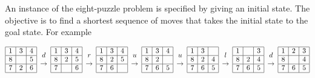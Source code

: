 \documentclass[12pt]{article}
\begin{document}
\noindent
An instance of the eight-puzzle problem is specified by giving an
initial state. 
The objective is to find a shortest sequence of
moves that takes the initial state to the goal state.
For example

\[
\begin{array}{|c|c|c|}\hline
1 & 3 & 4 \\\hline
8 &   & 5 \\\hline
7 & 2 & 6 \\\hline
\end{array}
\begin{array}{c}d\\\rightarrow\end{array}
\begin{array}{|c|c|c|}\hline
1 & 3 & 4 \\\hline
8 & 2 & 5 \\\hline
7 &   & 6 \\\hline
\end{array}
\begin{array}{c}r\\\rightarrow\end{array}
\begin{array}{|c|c|c|}\hline
1 & 3 & 4 \\\hline
8 & 2 & 5 \\\hline
7 & 6 &   \\\hline
\end{array}
\begin{array}{c}u\\\rightarrow\end{array}
\begin{array}{|c|c|c|}\hline
1 & 3 & 4 \\\hline
8 & 2 &   \\\hline
7 & 6 & 5 \\\hline
\end{array}
\begin{array}{c}u\\\rightarrow\end{array}
\begin{array}{|c|c|c|}\hline
1 & 3 &   \\\hline
8 & 2 & 4 \\\hline
7 & 6 & 5 \\\hline
\end{array}
\begin{array}{c}l\\\rightarrow\end{array}
\begin{array}{|c|c|c|}\hline
1 &   & 3 \\\hline
8 & 2 & 4 \\\hline
7 & 6 & 5 \\\hline
\end{array}
\begin{array}{c}d\\\rightarrow\end{array}
\begin{array}{|c|c|c|}\hline
1 & 2 & 3 \\\hline
8 &   & 4 \\\hline
7 & 6 & 5 \\\hline
\end{array}
\]
\end{document}
